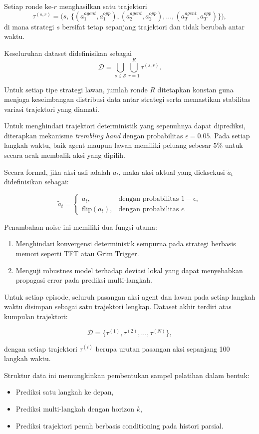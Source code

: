 Setiap ronde ke-$r$ menghasilkan satu trajektori
\[
\tau^{(s,r)} =
\Big(
s,\,
\{(a^{agent}_{1}, a^{opp}_{1}),
(a^{agent}_{2}, a^{opp}_{2}),
\dots,
(a^{agent}_{T}, a^{opp}_{T})\}
\Big),
\]
di mana strategi $s$ bersifat tetap sepanjang trajektori dan
tidak berubah antar waktu.

Keseluruhan dataset didefinisikan sebagai
\[
\mathcal{D}
=
\bigcup_{s \in \mathcal{S}}
\bigcup_{r=1}^{R}
\tau^{(s,r)}.
\]

Untuk setiap tipe strategi lawan, jumlah ronde $R$
ditetapkan konstan guna menjaga keseimbangan distribusi data
antar strategi serta memastikan stabilitas variasi trajektori
yang diamati.

Untuk menghindari trajektori deterministik yang sepenuhnya dapat diprediksi, diterapkan mekanisme \textit{trembling hand} dengan probabilitas $\epsilon = 0.05$. Pada setiap langkah waktu, baik agent maupun lawan memiliki peluang sebesar 5\% untuk secara acak membalik aksi yang dipilih.

Secara formal, jika aksi asli adalah $a_t$, maka aksi aktual yang dieksekusi $\tilde{a}_t$ didefinisikan sebagai:

\[
\tilde{a}_t =
\begin{cases}
a_t, & \text{dengan probabilitas } 1 - \epsilon, \\
\text{flip}(a_t), & \text{dengan probabilitas } \epsilon.
\end{cases}
\]

Penambahan noise ini memiliki dua fungsi utama:
\begin{enumerate}
    \item Menghindari konvergensi deterministik sempurna pada strategi berbasis memori seperti TFT atau Grim Trigger.
    \item Menguji robustnes model terhadap deviasi lokal yang dapat menyebabkan propagasi error pada prediksi multi-langkah.
\end{enumerate}

Untuk setiap episode, seluruh pasangan aksi agent dan lawan pada setiap langkah waktu disimpan sebagai satu trajektori lengkap. Dataset akhir terdiri atas kumpulan trajektori:

\[
\mathcal{D} = \{\tau^{(1)}, \tau^{(2)}, \dots, \tau^{(N)}\},
\]

dengan setiap trajektori $\tau^{(i)}$ berupa urutan pasangan aksi sepanjang 100 langkah waktu.

Struktur data ini memungkinkan pembentukan sampel pelatihan dalam bentuk:
\begin{itemize}
    \item Prediksi satu langkah ke depan,
    \item Prediksi multi-langkah dengan horizon $k$,
    \item Prediksi trajektori penuh berbasis conditioning pada histori parsial.
\end{itemize}

